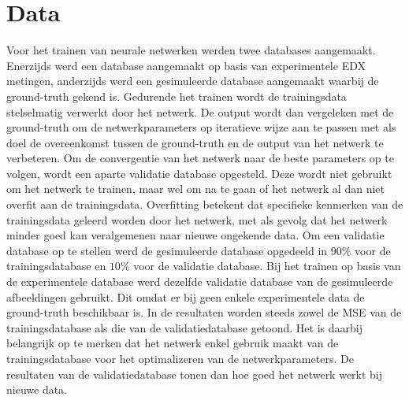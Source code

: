 \documentclass{report}
\begin{document}
\section{Data}
Voor het trainen van neurale netwerken werden twee databases aangemaakt. Enerzijds werd een database aangemaakt op basis van experimentele EDX metingen, anderzijds werd een gesimuleerde database aangemaakt waarbij de ground-truth gekend is. Gedurende het trainen wordt de trainingsdata stelselmatig verwerkt door het netwerk. De output wordt dan vergeleken met de ground-truth om de netwerkparameters op iteratieve wijze aan te passen met als doel de overeenkomst tussen de ground-truth en de output van het netwerk te verbeteren. Om de convergentie van het netwerk naar de beste parameters op te volgen, wordt een aparte validatie database opgesteld. Deze wordt niet gebruikt om het netwerk te trainen, maar wel om na te gaan of het netwerk al dan niet overfit aan de trainingsdata. Overfitting betekent dat specifieke kenmerken van de trainingsdata geleerd worden door het netwerk, met als gevolg dat het netwerk minder goed kan veralgemenen naar nieuwe ongekende data. Om een validatie database op te stellen werd de gesimuleerde database opgedeeld in $90\%$ voor de trainingsdatabase en $10\%$ voor de validatie database. Bij het trainen op basis van de experimentele database werd dezelfde validatie database van de gesimuleerde afbeeldingen gebruikt. Dit omdat er bij geen enkele experimentele data de ground-truth beschikbaar is. In de resultaten worden steeds zowel de MSE van de trainingsdatabase als die van de validatiedatabase getoond. Het is daarbij belangrijk op te merken dat het netwerk enkel gebruik maakt van de trainingsdatabase voor het optimalizeren van de netwerkparameters. De resultaten van de validatiedatabase tonen dan hoe goed het netwerk werkt bij nieuwe data.
\end{document}
